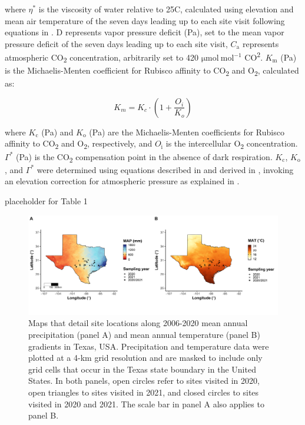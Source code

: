 \noindent where $\eta^{*}$ is the viscosity of water relative to 25\textdegree{}C, calculated using elevation and mean air temperature of the seven days leading up to each site visit following equations in . D represents vapor pressure deficit (Pa), set to the mean vapor pressure deficit of the seven days leading up to each site visit, $C_\mathrm{a}$ represents atmospheric CO\textsubscript{2} concentration, arbitrarily set to 420 $\mathrm{\mu mol\ mol^{-1}}$ CO\textsuperscript{2}. $K_\mathrm{m}$ (Pa) is the Michaelis-Menten coefficient for Rubisco affinity to CO\textsubscript{2} and O\textsubscript{2}, calculated as:
    
\begin{equation} \label{eq_4.6}
    K_{m} = K_{c} \cdot \left ( 1 + \frac{O_i}{K_o} \right )
\end{equation}

\noindent where $K_\mathrm{c}$ (Pa) and $K_\mathrm{o}$ (Pa) are the Michaelis-Menten coefficients for Rubisco affinity to CO\textsubscript{2} and O\textsubscript{2}, respectively, and $O_\mathrm{i}$  is the intercellular O\textsubscript{2} concentration. $\Gamma^{*}$ (Pa) is the CO\textsubscript{2} compensation point in the absence of dark respiration. $K_\mathrm{c}$, $K_\mathrm{o}$, and $\Gamma^{*}$ were determined using equations described in  and derived in , invoking an elevation correction for atmospheric pressure as explained in .
\clearpage

\newpage
placeholder for Table 1
\clearpage

\newpage
\begin{landscape}
    \begin{figure}
        \centering
        \includegraphics[scale = 0.05]{ch4_TXeco/figs/TXeco_fig1_site_map.png}
        \caption[Maps that detail site locations along 2006-2020 mean annual precipitation (panel A) and mean annual temperature (panel B) gradients in Texas, USA.]{Maps that detail site locations along 2006-2020 mean annual precipitation (panel A) and mean annual temperature (panel B) gradients in Texas, USA. Precipitation and temperature data were plotted at a 4-km grid resolution and are masked to include only grid cells that occur in the Texas state boundary in the United States. In both panels, open circles refer to sites visited in 2020, open triangles to sites visited in 2021, and closed circles to sites visited in 2020 and 2021. The scale bar in panel A also applies to panel B.}
        \label{fig:figure4.1}
    \end{figure}
\end{landscape}
\clearpage

